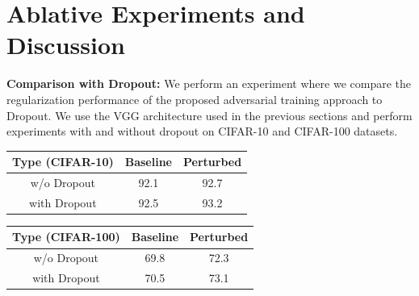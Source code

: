 \documentclass[letterpaper]{article} %
\begin{document}

\section{Ablative Experiments and Discussion}

\textbf{Comparison with Dropout:} We perform an experiment where we compare the regularization performance of the proposed adversarial training approach to Dropout. We use the VGG architecture used in the previous sections and perform experiments with and without dropout on CIFAR-10 and CIFAR-100 datasets. 

\begin{center}
\label{tab:dropout-results}
 \begin{tabular}{||c | c | c ||} 
 \hline
 Type (CIFAR-10) & Baseline & Perturbed \\ [0.5ex] 
 \hline
 w/o Dropout & 92.1 & 92.7  \\ 
 \hline
 with Dropout & 92.5 & 93.2 \\
 \hline  
\end{tabular}
\quad 
\begin{tabular}{||c | c | c ||} 
 \hline
 Type (CIFAR-100) & Baseline & Perturbed \\ [0.5ex] 
 \hline
 w/o Dropout & 69.8 & 72.3  \\ 
 \hline
 with Dropout & 70.5 & 73.1 \\
 \hline  
\end{tabular}
\end{center}
\end{document}
